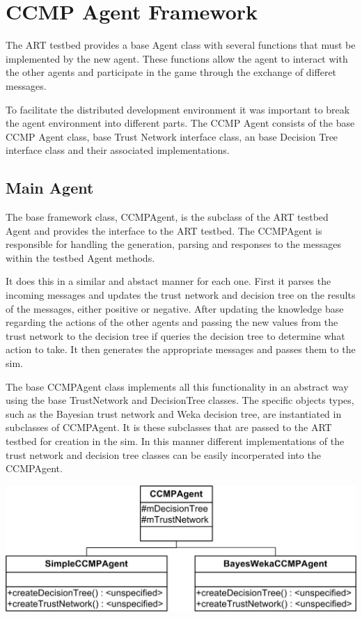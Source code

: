 \section{CCMP Agent Framework}
The ART testbed provides a base Agent class with several functions that must be
implemented by the new agent. These functions allow the agent to interact with
the other agents and participate in the game through the exchange of differet
messages.  

To facilitate the distributed development environment it was important to break
the agent environment into different parts.  The CCMP Agent consists of the
base CCMP Agent class, base Trust Network interface class, an base Decision
Tree interface class and their associated implementations.

\subsection{Main Agent}
The base framework class, CCMPAgent, is the subclass of the ART testbed Agent
and provides the interface to the ART testbed.  The CCMPAgent is
responsible for handling the generation, parsing and responses to the
messages within the testbed Agent methods.  

It does this in a similar and abstact manner for each one. First it parses the
incoming messages and updates the trust network and decision tree on the
results of the messages, either positive or negative.  After updating the
knowledge base regarding the actions of the other agents and passing the new
values from the trust network to the decision tree if queries the decision tree
to determine what action to take.  It then generates the appropriate
messages and passes them to the sim.

The base CCMPAgent class implements all this functionality in an abstract way
using the base TrustNetwork and DecisionTree classes.  The specific objects
types, such as the Bayesian trust network and Weka decision tree, are
instantiated in subclasses of CCMPAgent.  It is these subclasses that are passed
to the ART testbed for creation in the sim.  In this manner different
implementations of the trust network and decision tree classes can be easily
incorperated into the CCMPAgent.

\begin{center}
\includegraphics{images/CCMPClasses.jpg}
\end{center}

